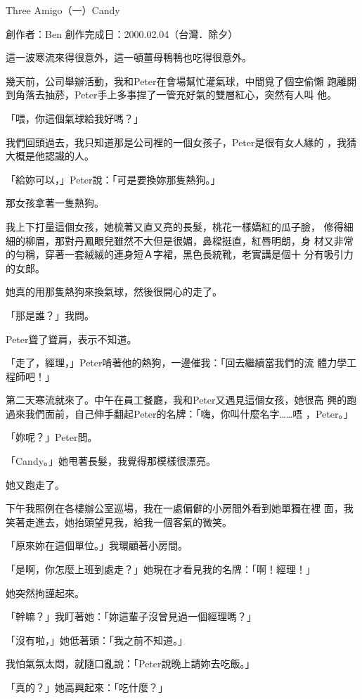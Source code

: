 



Three Amigo（一）Candy

創作者：Ben
創作完成日：2000.02.04（台灣．除夕）


這一波寒流來得很意外，這一頓薑母鴨鴨也吃得很意外。

幾天前，公司舉辦活動，我和Peter在會場幫忙灌氣球，中間覓了個空偷懶
跑離開到角落去抽菸，Peter手上多事捏了一管充好氣的雙層紅心，突然有人叫
他。

「喂，你這個氣球給我好嗎？」

我們回頭過去，我只知道那是公司裡的一個女孩子，Peter是很有女人緣的
，我猜大概是他認識的人。

「給妳可以，」Peter說：「可是要換妳那隻熱狗。」

那女孩拿著一隻熱狗。

我上下打量這個女孩，她梳著又直又亮的長髮，桃花一樣嬌紅的瓜子臉，
修得細細的柳眉，那對丹鳳眼兒雖然不大但是很媚，鼻樑挺直，紅唇明朗，身
材又非常的勻稱，穿著一套絨絨的連身短Ａ字裙，黑色長統靴，老實講是個十
分有吸引力的女郎。

她真的用那隻熱狗來換氣球，然後很開心的走了。

「那是誰？」我問。

Peter聳了聳肩，表示不知道。

「走了，經理，」Peter啃著他的熱狗，一邊催我：「回去繼續當我們的流
體力學工程師吧！」

第二天寒流就來了。中午在員工餐廳，我和Peter又遇見這個女孩，她很高
興的跑過來我們面前，自己伸手翻起Peter的名牌：「嗨，你叫什麼名字……唔
，Peter。」

「妳呢？」Peter問。

「Candy。」她甩著長髮，我覺得那模樣很漂亮。

她又跑走了。

下午我照例在各樓辦公室巡場，我在一處偏僻的小房間外看到她單獨在裡
面，我笑著走進去，她抬頭望見我，給我一個客氣的微笑。

「原來妳在這個單位。」我環顧著小房間。

「是啊，你怎麼上班到處走？」她現在才看見我的名牌：「啊！經理！」

她突然拘謹起來。

「幹嘛？」我盯著她：「妳這輩子沒曾見過一個經理嗎？」

「沒有啦，」她低著頭：「我之前不知道。」

我怕氣氛太悶，就隨口亂說：「Peter說晚上請妳去吃飯。」

「真的？」她高興起來：「吃什麼？」


